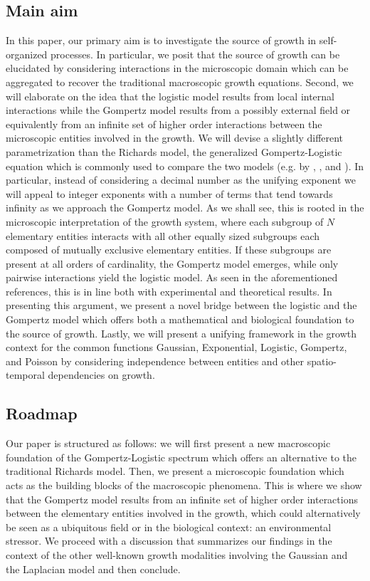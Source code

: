 \documentclass{article}
\begin{document}
\subsection{Main aim}
In this paper, our primary aim is to investigate the source of growth in self-organized processes. In particular, we posit that the source of growth can be elucidated by considering interactions in the microscopic domain which can be aggregated to recover the traditional macroscopic growth equations. Second, we will elaborate on the idea that the logistic model results from local internal interactions while the Gompertz model results from a possibly external field or equivalently from an infinite set of higher order interactions between the microscopic entities involved in the growth. We will devise a slightly different parametrization than the Richards model, the generalized Gompertz-Logistic equation which is commonly used to compare the two models (e.g. by \citet{petroni2020logistic}, \citet{tjorve2017use}, and \citet{wang2012richards}). In particular, instead of considering a decimal number as the unifying exponent we will appeal to integer exponents with a number of terms that tend towards infinity as we approach the Gompertz model. As we shall see, this is rooted in the microscopic interpretation of the growth system, where each subgroup of $N$ elementary entities interacts with all other equally sized subgroups each composed of mutually exclusive elementary entities. If these subgroups are present at all orders of cardinality, the Gompertz model emerges, while only pairwise interactions yield the logistic model. As seen in the aforementioned references, this is in line both with experimental and theoretical results. In presenting this argument, we present a novel bridge between the logistic and the Gompertz model which offers both a mathematical and biological foundation to the source of growth. Lastly, we will present a unifying framework in the growth context for the common functions Gaussian, Exponential, Logistic, Gompertz, and Poisson by considering independence between entities and other spatio-temporal dependencies on growth.

\subsection{Roadmap}
Our paper is structured as follows: we will first present a new macroscopic foundation of the Gompertz-Logistic spectrum which offers an alternative to the traditional Richards model. Then, we present a microscopic foundation which acts as the building blocks of the macroscopic phenomena. This is where we show that the Gompertz model results from an infinite set of higher order interactions between the elementary entities involved in the growth, which could alternatively be seen as a ubiquitous field or in the biological context: an environmental stressor. We proceed with a discussion that summarizes our findings in the context of the other well-known growth modalities involving the Gaussian and the Laplacian model and then conclude.
\end{document}
